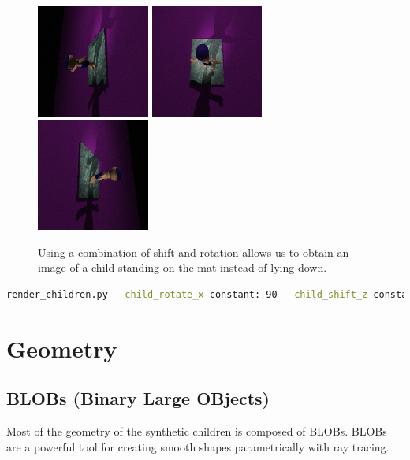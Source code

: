 \documentclass{article}
\begin{document}
\begin{figure}[htbp]
    \centering
    \includegraphics[height=3.7cm]{plots/child_000000_rgb_030d.png}
    \includegraphics[height=3.7cm]{plots/child_000000_rgb_090d.png}
    \includegraphics[height=3.7cm]{plots/child_000000_rgb_150d.png}
    \caption{Using a combination of shift and rotation allows us to obtain an image of a child standing on the mat instead of lying down.}
    \label{fig:standing}
\end{figure}

\begin{lstlisting}[language=bash]
render_children.py --child_rotate_x constant:-90 --child_shift_z constant:0.9 --child_shift_y constant:0.4 --camera_distance constant:11\end{lstlisting}

\section{Geometry}

\subsection{BLOBs (Binary Large OBjects)}

Most of the geometry of the synthetic children is composed of BLOBs. BLOBs are a powerful tool for creating smooth shapes parametrically with ray tracing.
\end{document}
